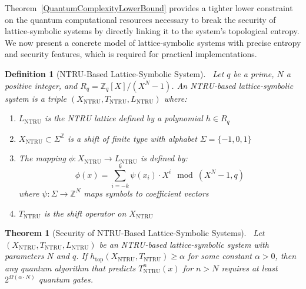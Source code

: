 \documentclass[12pt,a4paper]{article}
\newtheorem{theorem}{Theorem}[section]
\newtheorem{definition}{Definition}
\begin{document}
Theorem~\ref{QuantumComplexityLowerBound} provides a tighter lower constraint on the quantum computational resources necessary to break the security of lattice-symbolic systems by directly linking it to the system's topological entropy.
We now present a concrete model of lattice-symbolic systems with precise entropy and security features, which is required for practical implementations.

\begin{definition}[NTRU-Based Lattice-Symbolic System]~\label{NTRUBasedLatticeSymbolicSystem}
Let $q$ be a prime, $N$ a positive integer, and $R_q = \mathbb{Z}_q[X]/(X^N - 1)$. An NTRU-based lattice-symbolic system is a triple $(X_{\text{NTRU}}, T_{\text{NTRU}}, L_{\text{NTRU}})$ where:
\begin{enumerate}
\item $L_{\text{NTRU}}$ is the NTRU lattice defined by a polynomial $h \in R_q$
\item $X_{\text{NTRU}} \subset \Sigma^{\mathbb{Z}}$ is a shift of finite type with alphabet $\Sigma = \{-1, 0, 1\}$
\item The mapping $\phi: X_{\text{NTRU}} \rightarrow L_{\text{NTRU}}$ is defined by:
\begin{equation}
\phi(x) = \sum_{i=-k}^{k} \psi(x_i) \cdot X^i \mod (X^N - 1, q)
\end{equation}
where $\psi: \Sigma \rightarrow \mathbb{Z}^N$ maps symbols to coefficient vectors
\item $T_{\text{NTRU}}$ is the shift operator on $X_{\text{NTRU}}$
\end{enumerate}
\end{definition}

\begin{theorem}[Security of NTRU-Based Lattice-Symbolic Systems]~\label{SecurityofNTRUBasedLatticeSymbolicSystems}
Let $(X_{\text{NTRU}}, T_{\text{NTRU}}, L_{\text{NTRU}})$ be an NTRU-based lattice-symbolic system with parameters $N$ and $q$. If $h_{\text{top}}(X_{\text{NTRU}}, T_{\text{NTRU}}) \geq \alpha$ for some constant $\alpha > 0$, then any quantum algorithm that predicts $T_{\text{NTRU}}^n(x)$ for $n > N$ requires at least $2^{\Omega(\alpha \cdot N)}$ quantum gates.
\end{theorem}
\end{document}
